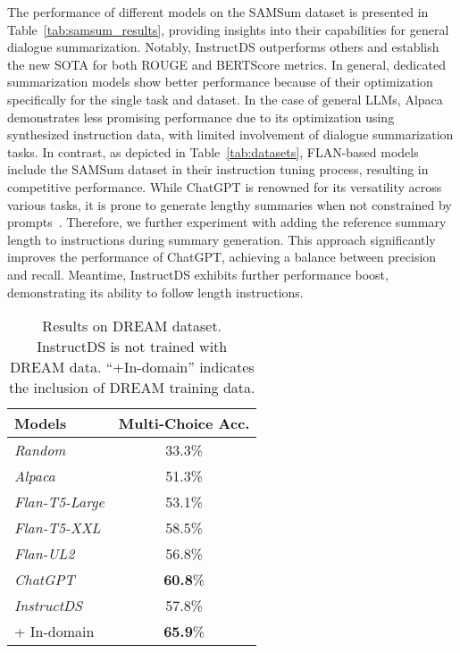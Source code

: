 \documentclass[11pt]{article}
\begin{document}
        The performance of different models on the SAMSum dataset is presented in Table~\ref{tab:samsum_results}, providing insights into their capabilities for general dialogue summarization. Notably, InstructDS outperforms others and establish the new SOTA for both ROUGE and BERTScore metrics. In general, dedicated summarization models show better performance because of their optimization specifically for the single task and dataset. In the case of general LLMs, Alpaca demonstrates less promising performance due to its optimization using synthesized instruction data, with limited involvement of dialogue summarization tasks. In contrast, as depicted in Table~\ref{tab:datasets}, FLAN-based models include the SAMSum dataset in their instruction tuning process, resulting in competitive performance. While ChatGPT is renowned for its versatility across various tasks, it is prone to generate lengthy summaries when not constrained by prompts~\cite{qin2023chatgpt}. Therefore, we further experiment with adding the reference summary length to instructions during summary generation. This approach significantly improves the performance of ChatGPT, achieving a balance between precision and recall. Meantime, InstructDS exhibits further performance boost, demonstrating its ability to follow length instructions.        

\begin{table}[t]
        \centering
        \begin{adjustbox}{width=0.42\textwidth,center}
        \begin{tabular}{| l | c |}
        \toprule
        Models & Multi-Choice Acc. \\
        \hline 
        \emph{Random} & 33.3\% \\
        \hline 
        \emph{Alpaca} & 51.3\% \\
        \emph{Flan-T5-Large} & 53.1\% \\ 
        \emph{Flan-T5-XXL} & 58.5\% \\ 
        \emph{Flan-UL2} & 56.8\% \\ 
        \emph{ChatGPT} & \textbf{60.8}\% \\ 
        \hline
        \emph{InstructDS} & 57.8\% \\
         + In-domain & \textbf{65.9}\% \\ 
        \bottomrule
        \end{tabular}
        \end{adjustbox}
        \caption{Results on DREAM dataset. InstructDS is not trained with DREAM data. ``+In-domain'' indicates the inclusion of DREAM training data.}
        \label{tab:dream_results}
    \end{table}
\end{document}
